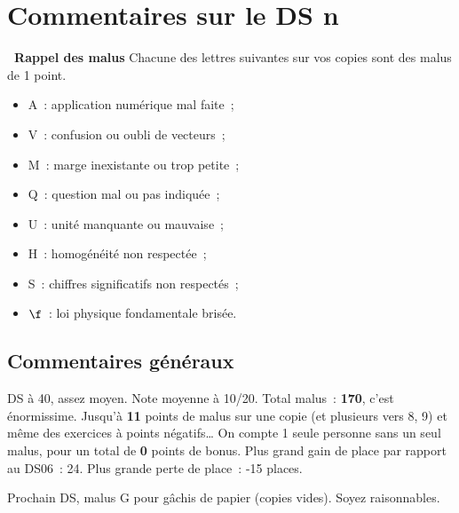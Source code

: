 \documentclass[a4paper, 10pt, final, garamond]{book}
\begin{document}
\setcounter{chapter}{6}

\chapter{Commentaires sur le DS n}

\begin{NCprop}[width=\linewidth]{\centering\bfseries\ Rappel des malus}
    Chacune des lettres suivantes sur vos copies sont des malus de \num{1}
    point.\smallbreak
    \begin{minipage}{0.50\linewidth}
        \begin{itemize}
            \item A~: application numérique mal faite~;
            \item V~: confusion ou oubli de vecteurs~;
            \item M~: marge inexistante ou trop petite~;
            \item Q~: question mal ou pas indiquée~;
        \end{itemize}
    \end{minipage}
    \begin{minipage}{0.50\linewidth}
        \begin{itemize}
            \item U~: unité manquante ou mauvaise~;
            \item H~: homogénéité non respectée~;
            \item S~: chiffres significatifs non respectés~;
            \item $\f$~: loi physique fondamentale brisée.
        \end{itemize}
    \end{minipage}
\end{NCprop}

\section{Commentaires généraux}

DS à 40, assez moyen. Note moyenne à 10/20. Total malus~: \textbf{170}, c'est
énormissime. Jusqu'à \textbf{11} points de malus sur une copie (et plusieurs
vers 8, 9) et même des exercices à points négatifs… On compte 1 seule personne
sans un seul malus, pour un total de \textbf{0} points de bonus. Plus grand gain
de place par rapport au DS06~: 24. Plus grande perte de place~: -15 places.

Prochain DS, malus G pour gâchis de papier (copies vides). Soyez raisonnables.
\end{document}
